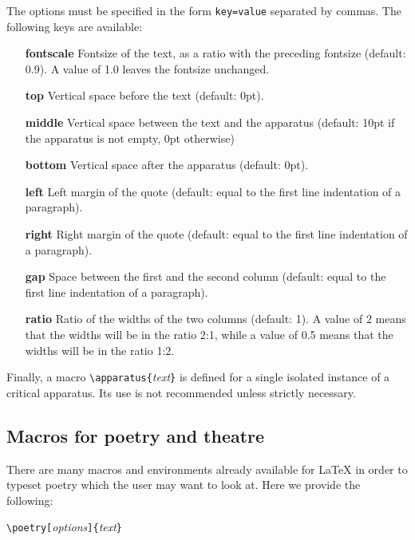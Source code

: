 \documentclass[11pt,a4paper]{article}
\begin{document}
	The options must be specified in the form \verb|key=value| separated by commas. The following keys are available:
	\begin{itemize}
		\item[\textbf{fontscale}] Fontsize of the text, as a ratio with the preceding fontsize (default: 0.9). A value of 1.0 leaves the fontsize  unchanged.
		\item[\textbf{top}] Vertical space before the text (default: 0pt).
		\item[\textbf{middle}] Vertical space between the text and the apparatus (default: 10pt if the apparatus is not empty, 0pt otherwise)
		\item[\textbf{bottom}] Vertical space after the apparatus (default: 0pt).
		\item[\textbf{left}] Left margin of the quote (default: equal to the first line indentation of a paragraph).
		\item[\textbf{right}] Right margin of the quote (default: equal to the first line indentation of a paragraph).
		\item[\textbf{gap}] Space between the first and the second column (default: equal to the first line indentation of a paragraph).
		\item[\textbf{ratio}] Ratio of the widths of the two columns (default: 1). A value of 2 means that the widths will be in the ratio 2:1, while a value of 0.5 means that the widths will be in the ratio 1:2.
	\end{itemize}
	
	Finally, a macro \verb|\apparatus{|\emph{text}\verb|}| is defined for a single isolated instance of a critical apparatus. Its use is not recommended unless strictly necessary.
	
	\subsection{Macros for poetry and theatre}
	
	There are many macros and environments already available for {\LaTeX} in order to typeset poetry which the user may want to look at. Here we provide the following:
	
	\medskip
	
	\verb|\poetry[|\emph{options}\verb|]{|\emph{text}\verb|}| 	
	
	\medskip
	
\end{document}
